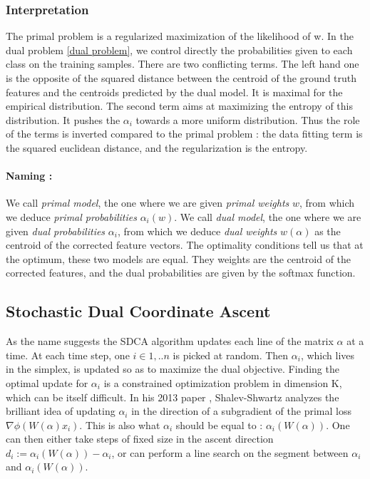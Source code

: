 \documentclass{article}
\DeclareMathOperator{\1}{\mathbb{1}}
\begin{document}
\subsubsection{Interpretation}
The primal problem is a regularized maximization of the likelihood of w. 
In the dual problem \ref{dual problem}, we control directly the probabilities given to each class on the training samples.
There are two conflicting terms.
The left hand one is the opposite of the squared distance between the centroid of the ground truth features and the centroids predicted by the dual model. It is maximal for the empirical distribution.
The second term aims at maximizing the entropy of this distribution.
It pushes the $\alpha_i$ towards a more uniform distribution.
Thus the role of the terms is inverted compared to the primal problem : the data fitting term is the squared euclidean distance, and the regularization is the entropy.

\paragraph{Naming :} 
We call \textit{primal model}, the one where we are given \textit{primal weights} $w$, from which we deduce \textit{primal probabilities} $\alpha_i(w)$.
We call \textit{dual model}, the one where we are given \textit{dual probabilities} $\alpha_i$, from which we deduce \textit{dual weights} $w(\alpha)$ as the centroid of the corrected feature vectors.
The optimality conditions tell us that at the optimum, these two models are equal.
They weights are the centroid of the corrected features, and the dual probabilities are given by the softmax function.


\subsection{Stochastic Dual Coordinate Ascent}
As the name suggests the SDCA algorithm updates each line of the matrix $\alpha$ at a time.
At each time step, one $i\in{1,..n}$ is picked at random.
Then $\alpha_i$, which lives in the simplex, is updated so as to maximize the dual objective.
Finding the optimal update for $\alpha_i$ is a constrained optimization problem in dimension K, which can be itself difficult. 
In his 2013 paper \cite{shalev-shwartz_accelerated_2013-1}, Shalev-Shwartz analyzes the brilliant idea of updating $\alpha_i$ in the direction of a subgradient of the primal loss $\nabla\phi(W(\alpha)x_i)$.
This is also what $\alpha_i$ should be equal to : $\alpha_i(W(\alpha))$.
One can then either take steps of fixed size in the ascent direction $d_i := \alpha_i(W(\alpha)) - \alpha_i$, or can perform a line search on the segment between $\alpha_i$ and $\alpha_i(W(\alpha))$.
\end{document}
